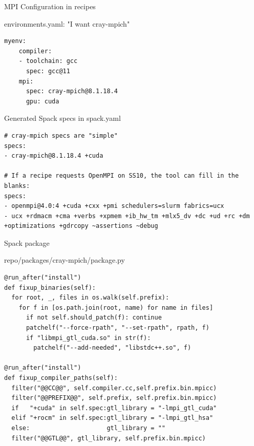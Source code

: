 \documentclass[aspectratio=43]{beamer}
\begin{document}
\begin{frame}[fragile]{MPI Configuration in recipes}

\begin{code}{environments.yaml: "I want cray-mpich"}
    \begin{lstlisting}[style=talkyaml]
myenv:
    compiler:
    - toolchain: gcc
      spec: gcc@11
    mpi:
      spec: cray-mpich@8.1.18.4
      gpu: cuda \end{lstlisting}
\end{code}

\begin{code}{Generated Spack specs in spack.yaml}
    \begin{lstlisting}[style=talkyaml]
# cray-mpich specs are "simple"
specs:
- cray-mpich@8.1.18.4 +cuda

# If a recipe requests OpenMPI on SS10, the tool can fill in the blanks:
specs:
- openmpi@4.0:4 +cuda +cxx +pmi schedulers=slurm fabrics=ucx
- ucx +rdmacm +cma +verbs +xpmem +ib_hw_tm +mlx5_dv +dc +ud +rc +dm +optimizations +gdrcopy ~assertions ~debug \end{lstlisting}
\end{code}

\end{frame}

\begin{frame}[fragile]{Spack package}

\begin{code}{repo/packages/cray-mpich/package.py}
    \begin{lstlisting}[style=talkbash]
@run_after("install")
def fixup_binaries(self):
  for root, _, files in os.walk(self.prefix):
    for f in [os.path.join(root, name) for name in files]
      if not self.should_patch(f): continue
      patchelf("--force-rpath", "--set-rpath", rpath, f)
      if "libmpi_gtl_cuda.so" in str(f):
        patchelf("--add-needed", "libstdc++.so", f)

@run_after("install")
def fixup_compiler_paths(self):
  filter("@@CC@@", self.compiler.cc,self.prefix.bin.mpicc)
  filter("@@PREFIX@@", self.prefix, self.prefix.bin.mpicc)
  if   "+cuda" in self.spec:gtl_library = "-lmpi_gtl_cuda"
  elif "+rocm" in self.spec:gtl_library = "-lmpi_gtl_hsa"
  else:                     gtl_library = ""
  filter("@@GTL@@", gtl_library, self.prefix.bin.mpicc) \end{lstlisting}
\end{code}

\end{frame}
\end{document}
